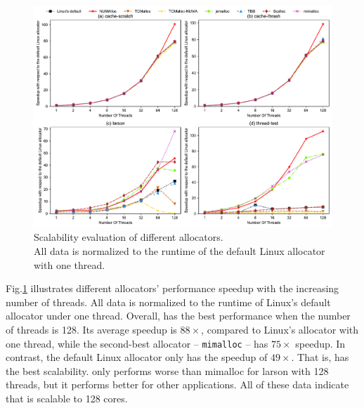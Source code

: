 \begin{figure}[!th]
    \centering
    \includegraphics[width=\textwidth]{figure/sythentic-scalobility-new.pdf}
    \caption{Scalability evaluation of different allocators.\\ All data is normalized to the runtime of the default Linux allocator with one thread.}
    \label{sythentic-scalability}
\end{figure}

Fig.\ref{sythentic-scalability} illustrates different allocators' performance speedup with the increasing number of threads. All data is normalized to the runtime of Linux's default allocator under one thread. Overall, \NM{} has the best performance when the number of threads is 128. Its average speedup is $88\times$, compared to Linux's allocator with one thread, while the second-best allocator -- \texttt{mimalloc} -- has $75\times$ speedup. In contrast, the default Linux allocator only has the speedup of $49\times$. That is, \NM{} has the best scalability.
\NM{} only performs worse than mimalloc for larson with 128 threads, but it performs better for other applications. All of these data indicate that \NM{} is scalable to 128 cores. 



